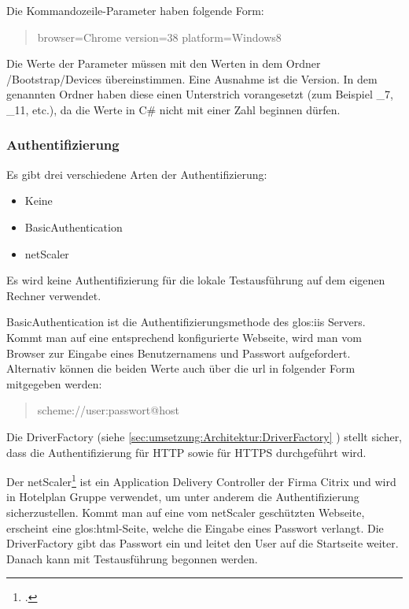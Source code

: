 Die Kommandozeile-Parameter haben folgende Form:
\begin{quote}
browser=Chrome version=38 platform=Windows8
\end{quote}
Die Werte der Parameter müssen mit den Werten in dem Ordner /Bootstrap/Devices übereinstimmen. Eine Ausnahme ist die Version. In dem genannten Ordner haben diese einen Unterstrich vorangesetzt (zum Beispiel \_7, \_11, etc.), da die Werte in C\# nicht mit einer Zahl beginnen dürfen.

\subsubsection{Authentifizierung}
\label{sec:umsetzung:architektur:bootstrap:Authentifizierung}
Es gibt drei verschiedene Arten der Authentifizierung:
\begin{itemize}
\item Keine
\item BasicAuthentication
\item netScaler
\end{itemize}

Es wird keine Authentifizierung für die lokale Testausführung auf dem eigenen Rechner verwendet. 

BasicAuthentication ist die Authentifizierungsmethode des \Gls{glos:iis} Servers. Kommt man auf eine entsprechend konfigurierte Webseite, wird man vom Browser zur Eingabe eines Benutzernamens und Passwort aufgefordert. Alternativ können die beiden Werte auch über die \gls{url} in folgender Form mitgegeben werden:
\begin{quote}
	scheme://user:passwort@host
\end{quote}
Die DriverFactory (siehe \cref{sec:umsetzung:Architektur:DriverFactory} ) stellt sicher, dass die Authentifizierung für HTTP sowie für HTTPS durchgeführt wird.

Der netScaler\footcite{NetScaler} ist ein Application Delivery Controller der Firma Citrix und wird in Hotelplan Gruppe verwendet, um unter anderem die Authentifizierung sicherzustellen. Kommt man auf eine vom netScaler geschützten Webseite, erscheint eine \Gls{glos:html}-Seite, welche die Eingabe eines Passwort verlangt. Die DriverFactory gibt das Passwort ein und leitet den User auf die Startseite weiter. Danach kann mit Testausführung begonnen werden.

